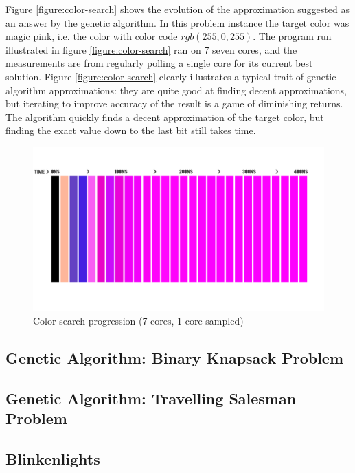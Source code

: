 Figure \vref{figure:color-search} shows the evolution of the approximation suggested as an answer by the genetic algorithm.
In this problem instance the target color was magic pink, i.e. the color with color code $ rgb(255, 0, 255) $.
The program run illustrated in figure \vref{figure:color-search} ran on 7 seven cores, and the measurements are from regularly polling a single core for its current best solution.
Figure \vref{figure:color-search} clearly illustrates a typical trait of genetic algorithm approximations: they are quite good at finding decent approximations, but iterating to improve accuracy of the result is a game of diminishing returns.
The algorithm quickly finds a decent approximation of the target color, but finding the exact value down to the last bit still takes time.

\begin{figure}[H]
    \begin{center}
        \includegraphics[width=\textwidth]{fig/color-search}
    \caption{Color search progression (7 cores, 1 core sampled)}
    \label{figure:color-search}
    \end{center}
\end{figure}

\subsection{Genetic Algorithm: Binary Knapsack Problem}


\subsection{Genetic Algorithm: Travelling Salesman Problem}


\subsection{Blinkenlights}

